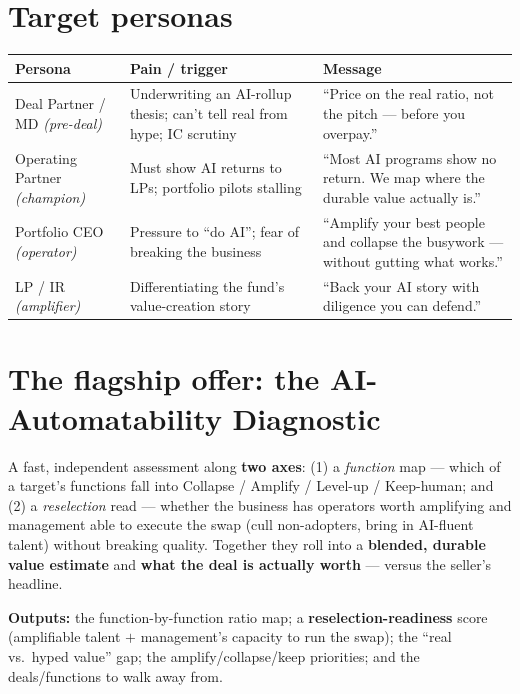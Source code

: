 \documentclass[11pt]{article}
\begin{document}
\section{Target personas}
\begin{center}
\renewcommand{\arraystretch}{1.3}\small
\begin{tabular}{p{2.7cm} p{4.6cm} p{5.2cm}}
\toprule
\textbf{Persona} & \textbf{Pain / trigger} & \textbf{Message} \\
\midrule
Deal Partner / MD \emph{(pre-deal)} & Underwriting an AI-rollup thesis; can't tell real from hype; IC scrutiny & ``Price on the real ratio, not the pitch --- before you overpay.'' \\
Operating Partner \emph{(champion)} & Must show AI returns to LPs; portfolio pilots stalling & ``Most AI programs show no return. We map where the durable value actually is.'' \\
Portfolio CEO \emph{(operator)} & Pressure to ``do AI''; fear of breaking the business & ``Amplify your best people and collapse the busywork --- without gutting what works.'' \\
LP / IR \emph{(amplifier)} & Differentiating the fund's value-creation story & ``Back your AI story with diligence you can defend.'' \\
\bottomrule
\end{tabular}
\end{center}

\section{The flagship offer: the AI-Automatability Diagnostic}
A fast, independent assessment along \textbf{two axes}: (1) a \emph{function} map --- which of a
target's functions fall into Collapse / Amplify / Level-up / Keep-human; and (2) a
\emph{reselection} read --- whether the business has operators worth amplifying and management
able to execute the swap (cull non-adopters, bring in AI-fluent talent) without breaking quality.
Together they roll into a \textbf{blended, durable value estimate} and \textbf{what the deal is
actually worth} --- versus the seller's headline.

\textbf{Outputs:} the function-by-function ratio map; a \textbf{reselection-readiness} score
(amplifiable talent $+$ management's capacity to run the swap); the ``real vs.\ hyped value''
gap; the amplify/collapse/keep priorities; and the deals/functions to walk away from.
\end{document}
